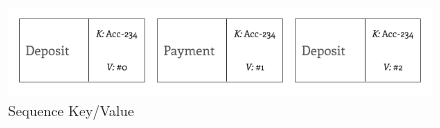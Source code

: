\begin{figure}[ht]
\begin{center}
\includegraphics[width=15cm]{figures/consistency-3}
\end{center}
\caption{Sequence Key/Value}
\label{fig:consistency-3}
\end{figure}